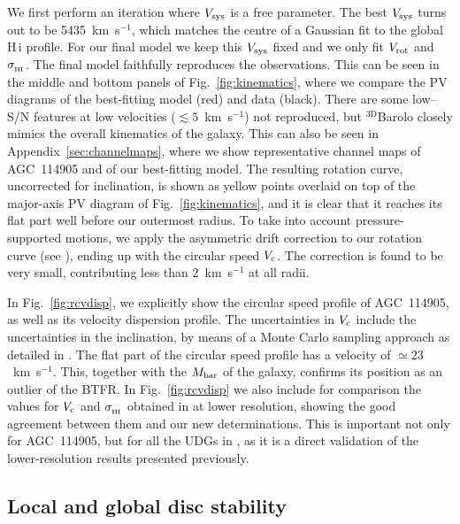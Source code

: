 \documentclass[fleqn,usenatbib]{mnras}
\begin{document}
We first perform an iteration where $V_{\rm sys}$ is a free parameter. The best $V_{\rm sys}$ turns out to be 5435~km~s$^{-1}$, which matches the centre of a Gaussian fit to the global H\,{\sc i} profile. For our final model we keep this $V_{\rm sys}$ fixed and we only fit $V_{\rm rot}$ and $\sigma_{_{\rm HI}}$. The final model faithfully reproduces the observations. This can be seen in the middle and bottom panels of Fig.~\ref{fig:kinematics}, where we compare the PV diagrams of the best-fitting model (red) and data (black). There are some low--S/N features at low velocities ($\lesssim 5$~km~s$^{-1}$) not reproduced, but $\mathrm{^{3D}}$Barolo closely mimics the overall kinematics of the galaxy. This can also be seen in Appendix~\ref{sec:channelmaps}, where we show representative channel maps of AGC~114905 and of our best-fitting model. The resulting rotation curve, uncorrected for inclination, is shown as yellow points overlaid on top of the major-axis PV diagram of Fig.~\ref{fig:kinematics}, and it is clear that it reaches its flat part well before our outermost radius. To take into account pressure-supported motions, we apply the asymmetric drift correction to our rotation curve (see \citealt{iorio}), ending up with the circular speed $V_{\rm c}$. The correction is found to be very small, contributing less than 2~km~s$^{-1}$ at all radii. 

In Fig.~\ref{fig:rcvdisp}, we explicitly show the circular speed profile of AGC~114905, as well as its velocity dispersion profile. The uncertainties in $V_{\rm c}$ include the uncertainties in the inclination, by means of a Monte Carlo sampling approach as detailed in \citet{huds2020}. The flat part of the circular speed profile has a velocity of $\simeq 23$~km~s$^{-1}$. This, together with the $M_{\rm bar}$ of the galaxy, confirms its position as an outlier of the BTFR. In Fig.~\ref{fig:rcvdisp} we also include for comparison the values for $V_{\rm c}$ and $\sigma_{_{\rm HI}}$ obtained in \citet{huds2019,huds2020} at lower resolution, showing the good agreement between them and our new determinations. This is important not only for AGC~114905, but for all the UDGs in \citet{huds2019,huds2020}, as it is a direct validation of the lower-resolution results presented previously.


\subsection{Local and global disc stability}
\end{document}
